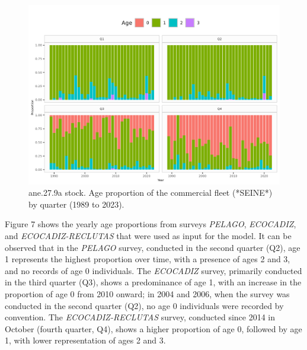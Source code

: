 \documentclass[
]{article}
\begin{document}
\begin{figure}[H]

{\centering \includegraphics[width=0.95\linewidth]{report/run/S1.0_4FLEETS/fig_agecomp_by_quartersSeine} 

}

\caption{ane.27.9a stock. Age proportion of the commercial fleet (*SEINE*) by quarter (1989 to 2023).}\label{fig:unnamed-chunk-7}
\end{figure}

Figure 7 shows the yearly age proportions from surveys \emph{PELAGO},
\emph{ECOCADIZ}, and \emph{ECOCADIZ-RECLUTAS} that were used as input
for the model. It can be observed that in the \emph{PELAGO} survey,
conducted in the second quarter (Q2), age 1 represents the highest
proportion over time, with a presence of ages 2 and 3, and no records of
age 0 individuals. The \emph{ECOCADIZ} survey, primarily conducted in
the third quarter (Q3), shows a predominance of age 1, with an increase
in the proportion of age 0 from 2010 onward; in 2004 and 2006, when the
survey was conducted in the second quarter (Q2), no age 0 individuals
were recorded by convention. The \emph{ECOCADIZ-RECLUTAS} survey,
conducted since 2014 in October (fourth quarter, Q4), shows a higher
proportion of age 0, followed by age 1, with lower representation of
ages 2 and 3.
\end{document}
